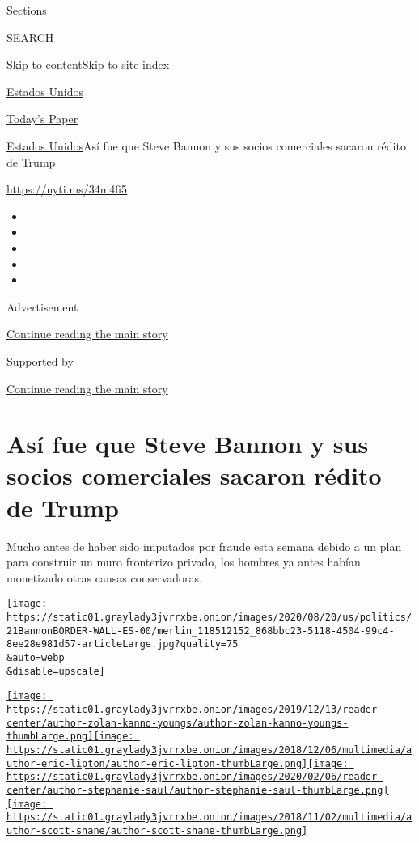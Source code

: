 Sections

SEARCH

\protect\hyperlink{site-content}{Skip to
content}\protect\hyperlink{site-index}{Skip to site index}

\href{https://www.nytimes3xbfgragh.onion/es/section/estados-unidos}{Estados
Unidos}

\href{https://myaccount.nytimes3xbfgragh.onion/auth/login?response_type=cookie\&client_id=vi}{}

\href{https://www.nytimes3xbfgragh.onion/section/todayspaper}{Today's
Paper}

\href{/es/section/estados-unidos}{Estados Unidos}\textbar{}Así fue que
Steve Bannon y sus socios comerciales sacaron rédito de Trump

\url{https://nyti.ms/34m4fi5}

\begin{itemize}
\item
\item
\item
\item
\item
\end{itemize}

Advertisement

\protect\hyperlink{after-top}{Continue reading the main story}

Supported by

\protect\hyperlink{after-sponsor}{Continue reading the main story}

\hypertarget{asuxed-fue-que-steve-bannon-y-sus-socios-comerciales-sacaron-ruxe9dito-de-trump}{%
\section{Así fue que Steve Bannon y sus socios comerciales sacaron
rédito de
Trump}\label{asuxed-fue-que-steve-bannon-y-sus-socios-comerciales-sacaron-ruxe9dito-de-trump}}

Mucho antes de haber sido imputados por fraude esta semana debido a un
plan para construir un muro fronterizo privado, los hombres ya antes
habían monetizado otras causas conservadoras.

\texttt{[image: https://static01.graylady3jvrrxbe.onion/images/2020/08/20/us/politics/21BannonBORDER-WALL-ES-00/merlin\_118512152\_868bbc23-5118-4504-99c4-8ee28e981d57-articleLarge.jpg?quality=75\\\&auto=webp\\\&disable=upscale]}

\href{https://www.nytimes3xbfgragh.onion/by/zolan-kanno-youngs}{\texttt{[image: https://static01.graylady3jvrrxbe.onion/images/2019/12/13/reader-center/author-zolan-kanno-youngs/author-zolan-kanno-youngs-thumbLarge.png]}}\href{https://www.nytimes3xbfgragh.onion/by/eric-lipton}{\texttt{[image: https://static01.graylady3jvrrxbe.onion/images/2018/12/06/multimedia/author-eric-lipton/author-eric-lipton-thumbLarge.png]}}\href{https://www.nytimes3xbfgragh.onion/by/stephanie-saul}{\texttt{[image: https://static01.graylady3jvrrxbe.onion/images/2020/02/06/reader-center/author-stephanie-saul/author-stephanie-saul-thumbLarge.png]}}\href{https://www.nytimes3xbfgragh.onion/by/scott-shane}{\texttt{[image: https://static01.graylady3jvrrxbe.onion/images/2018/11/02/multimedia/author-scott-shane/author-scott-shane-thumbLarge.png]}}

